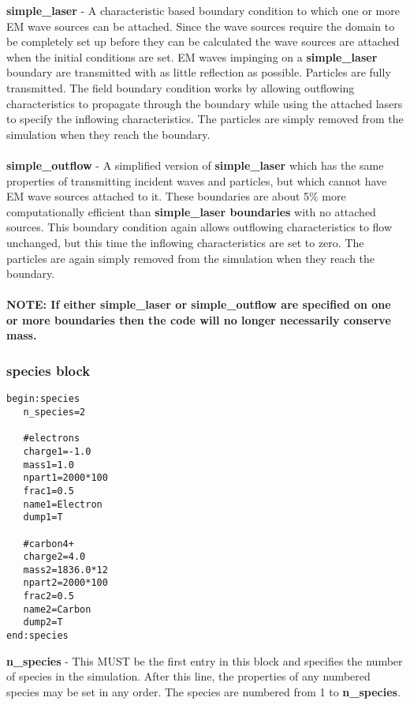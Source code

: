 \documentclass[12pt,a4paper]{article}
\newcommand{\emphtext}{\color{warwickdark} \fontfamily{phv}\selectfont\Large\bf}
\newcommand{\boxverbatim}[1]{\begin{Verbatim}[obeytabs=true,frame=single,
  framerule=0.5mm,rulecolor=\color{warwickmid},formatcom=\color{black},label=#1]}
\newcommand{\inlineemph}[1]{{\color{warwicklight} \bf{#1}}}
\begin{document}
{\emphtext simple\_laser} - A characteristic based boundary condition to which
one or more EM wave sources can be attached. Since the wave sources require the
domain to be completely set up before they can be calculated the wave sources
are attached when the initial conditions are set.  EM waves impinging on a
\inlineemph{simple\_laser} boundary are transmitted with as little reflection
as possible. Particles are fully transmitted. The field boundary condition
works by allowing outflowing characteristics to propagate through the boundary
while using the attached lasers to specify the inflowing characteristics. The
particles are simply removed from the simulation when they reach the
boundary.\\\\

{\emphtext simple\_outflow} - A simplified version of \inlineemph{simple\_laser}
which has the same properties of transmitting incident waves and
particles, but which cannot have EM wave sources attached to it. These
boundaries are about 5\% more computationally efficient than
\inlineemph{simple\_laser boundaries} with no attached sources. This boundary
condition again allows outflowing characteristics to flow unchanged, but this
time the inflowing characteristics are set to zero. The particles are again
simply removed from the simulation when they reach the boundary.\\\\

{\emphtext NOTE: If either simple\_laser or simple\_outflow are specified on
one or more boundaries then the code will no longer necessarily conserve mass.}

\subsubsection{\inlineemph{species} block}

\boxverbatim{species block}
begin:species
   n_species=2

   #electrons
   charge1=-1.0
   mass1=1.0
   npart1=2000*100
   frac1=0.5
   name1=Electron
   dump1=T

   #carbon4+
   charge2=4.0
   mass2=1836.0*12
   npart2=2000*100
   frac2=0.5
   name2=Carbon
   dump2=T
end:species
\end{Verbatim}

{\emphtext n\_species} - This MUST be the first entry in this block and
specifies the number of species in the simulation. After this line, the
properties of any numbered species may be set in any order. The species are
numbered from 1 to \inlineemph{n\_species}.\\
\end{document}
